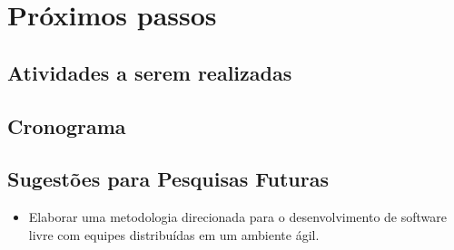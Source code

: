\chapter{Próximos passos}
\label{cap:perspectivas}


\section{Atividades a serem realizadas}
\label{sec:atividades}


\section{Cronograma}
\label{sec:cronograma}

\section{Sugestões para Pesquisas Futuras} 

\begin{itemize}
	\item Elaborar uma metodologia direcionada para o
          desenvolvimento de software livre com equipes distribuídas
          em um ambiente ágil.
\end{itemize}
